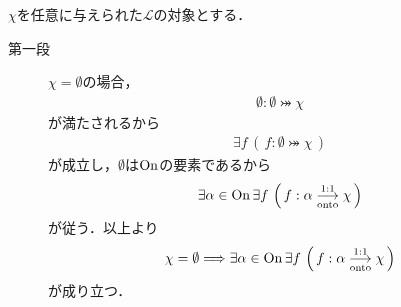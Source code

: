 	\begin{prf} $\chi$を任意に与えられた$\mathcal{L}$の対象とする．
		\begin{description}
			\item[第一段]
				$\chi = \emptyset$の場合，
				\begin{align}
					\emptyset: \emptyset \bij \chi
				\end{align}
				が満たされるから
				\begin{align}
					\exists f\, \left(\, f:\emptyset \bij \chi\, \right)
				\end{align}
				が成立し，$\emptyset$は$\mathrm{On}$の要素であるから
				\begin{align}
					\exists \alpha \in \mathrm{On}\, \exists f\, \left(\, f:\alpha \underset{\mathrm{onto}}{\overset{\mathrm{1:1}}{\longrightarrow}} \chi\, \right)
				\end{align}
				が従う．以上より
				\begin{align}
					\chi = \emptyset \Longrightarrow \exists \alpha \in \mathrm{On}\, 
					\exists f\, \left(\, f:\alpha \underset{\mathrm{onto}}{\overset{\mathrm{1:1}}{\longrightarrow}} \chi\, \right)
				\end{align}
				が成り立つ．
				

\end{description}
\end{prf}
